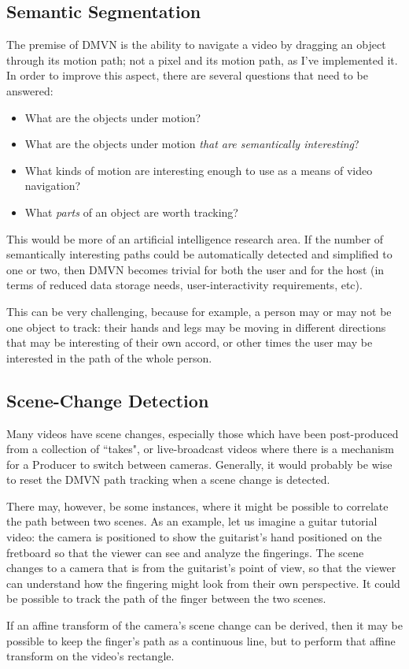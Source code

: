\subsection{Semantic Segmentation}
The premise of DMVN is the ability to navigate a video by dragging an object through its motion path; not a pixel and its motion path, as I've implemented it. In order to improve this aspect, there are several questions that need to be answered:
\begin{itemize}
    \item What are the objects under motion?
    \item What are the objects under motion \emph{that are semantically interesting}?
    \item What kinds of motion are interesting enough to use as a means of video navigation?
    \item What \emph{parts} of an object are worth tracking?
\end{itemize}
This would be more of an artificial intelligence research area. If the number of semantically interesting paths could be automatically detected and simplified to one or two, then DMVN becomes trivial for both the user and for the host (in terms of reduced data storage needs, user-interactivity requirements, etc).
\par This can be very challenging, because for example, a person may or may not be one object to track: their hands and legs may be moving in different directions that may be interesting of their own accord, or other times the user may be interested in the path of the whole person.

\subsection{Scene-Change Detection}
    Many videos have scene changes, especially those which have been post-produced from a collection of ``takes", or live-broadcast videos where there is a mechanism for a Producer to switch between cameras. Generally, it would probably be wise to reset the DMVN path tracking when a scene change is detected.\par
    There may, however, be some instances, where it might be possible to correlate the path between two scenes. As an example, let us imagine a guitar tutorial video: the camera is positioned to show the guitarist's hand positioned on the fretboard so that the viewer can see and analyze the fingerings. The scene changes to a camera that is from the guitarist's point of view, so that the viewer can understand how the fingering might look from their own perspective. It could be possible to track the path of the finger between the two scenes.\par
    If an affine transform of the camera's scene change can be derived, then it may be possible to keep the finger's path as a continuous line, but to perform that affine transform on the video's rectangle.

